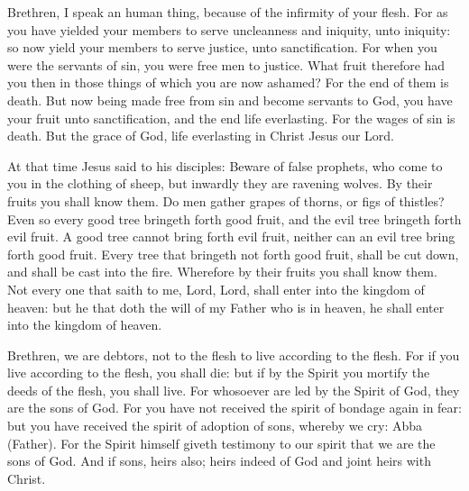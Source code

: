 \begin{multicols}{2}


Brethren, I speak an human thing, because of the infirmity of your flesh.
For as you have yielded your members to serve uncleanness and iniquity,
unto iniquity: so now yield your members to serve justice, unto
sanctification.
For when you were the servants of sin, you were free men to
justice.
What fruit therefore had you then in those things of which you are
now ashamed? For the end of them is death.
But now being made free from sin and become servants to God, you
have your fruit unto sanctification, and the end life everlasting.
For the wages of sin is death. But the grace of God, life
everlasting in Christ Jesus our Lord.



At that time Jesus said to his disciples:
Beware of false prophets, who come to you in the clothing of
sheep, but inwardly they are ravening wolves.
By their fruits you shall know them. Do men gather grapes of
thorns, or figs of thistles?
Even so every good tree bringeth forth good fruit, and the evil
tree bringeth forth evil fruit.
A good tree cannot bring forth evil fruit, neither can an evil
tree bring forth good fruit.
Every tree that bringeth not forth good fruit, shall be cut down,
and shall be cast into the fire.
Wherefore by their fruits you shall know them.
Not every one that saith to me, Lord, Lord, shall enter into the
kingdom of heaven: but he that doth the will of my Father who is in
heaven, he shall enter into the kingdom of heaven.



\bigskip



Brethren, we are debtors, not to the flesh to live
according to the flesh.
For if you live according to the flesh, you shall die: but if by
the Spirit you mortify the deeds of the flesh, you shall live.
For whosoever are led by the Spirit of God, they are the sons of
God.
For you have not received the spirit of bondage again in fear: but
you have received the spirit of adoption of sons, whereby we cry: Abba
(Father).
For the Spirit himself giveth testimony to our spirit that we are
the sons of God.
And if sons, heirs also; heirs indeed of God and joint heirs with
Christ. %



\end{multicols}
